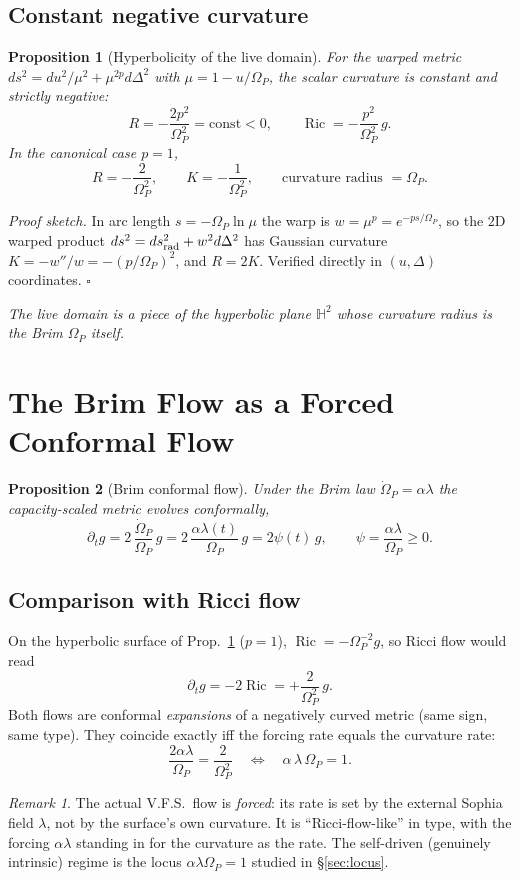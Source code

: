 \documentclass[11pt,a4paper]{article}
\newcommand{\Op}{\Omega_P}
\newcommand{\Ric}{\operatorname{Ric}}
\newcommand{\note}[1]{\textcolor{black!65}{\emph{#1}}}
\theoremstyle{plain}
\newtheorem{proposition}{Proposition}
\theoremstyle{remark}
\newtheorem*{remark}{Remark}
\theoremstyle{definition}
\begin{document}
\subsection*{Constant negative curvature}
\begin{proposition}[Hyperbolicity of the live domain]\label{prop:hyp}
For the warped metric $ds^2=du^2/\mu^2+\mu^{2p}d\Delta^2$ with $\mu=1-u/\Op$, the scalar curvature is
constant and strictly negative:
\[
\boxed{\;R=-\frac{2p^2}{\Op^2}=\mathrm{const}<0,\qquad
\Ric=-\frac{p^2}{\Op^2}\,g.\;}
\]
In the canonical case $p=1$,
\[
\boxed{R=-\frac{2}{\Op^2},\qquad K=-\frac{1}{\Op^2},\qquad
\text{curvature radius }=\Op.}
\]
\end{proposition}
\noindent\emph{Proof sketch.} In arc length $s=-\Op\ln\mu$ the warp is $w=\mu^p=e^{-ps/\Op}$, so the
$2$D warped product $ds^2=ds^2_{\rm rad}+w^2d\Delta^2$ has Gaussian curvature
$K=-w''/w=-(p/\Op)^2$, and $R=2K$. Verified directly in $(u,\Delta)$ coordinates. \hfill$\square$

\note{The live domain is a piece of the hyperbolic plane $\mathbb H^2$ whose curvature radius is the
Brim $\Op$ itself.}

\section{The Brim Flow as a Forced Conformal Flow}

\begin{proposition}[Brim conformal flow]\label{prop:flow}
Under the Brim law $\dot\Op=\alpha\lambda$ the capacity-scaled metric evolves conformally,
\[
\boxed{\partial_t g=2\,\frac{\dot\Op}{\Op}\,g=2\,\frac{\alpha\lambda(t)}{\Op}\,g
=2\psi(t)\,g,\qquad \psi=\frac{\alpha\lambda}{\Op}\ge0.}
\]
\end{proposition}

\subsection*{Comparison with Ricci flow}
On the hyperbolic surface of Prop.~\ref{prop:hyp} ($p=1$), $\Ric=-\Op^{-2}g$, so Ricci flow would read
\[
\boxed{\partial_t g=-2\Ric=+\frac{2}{\Op^2}\,g.}
\]
Both flows are conformal \emph{expansions} of a negatively curved metric (same sign, same type). They
coincide exactly iff the forcing rate equals the curvature rate:
\[
\boxed{\frac{2\alpha\lambda}{\Op}=\frac{2}{\Op^2}
\quad\Longleftrightarrow\quad \alpha\,\lambda\,\Op=1.}
\]
\begin{remark}
The actual V.F.S.\ flow is \emph{forced}: its rate is set by the external Sophia field $\lambda$, not
by the surface's own curvature. It is ``Ricci-flow-like'' in type, with the forcing $\alpha\lambda$
standing in for the curvature as the rate. The self-driven (genuinely intrinsic) regime is the
locus $\alpha\lambda\Op=1$ studied in \S\ref{sec:locus}.
\end{remark}
\end{document}
